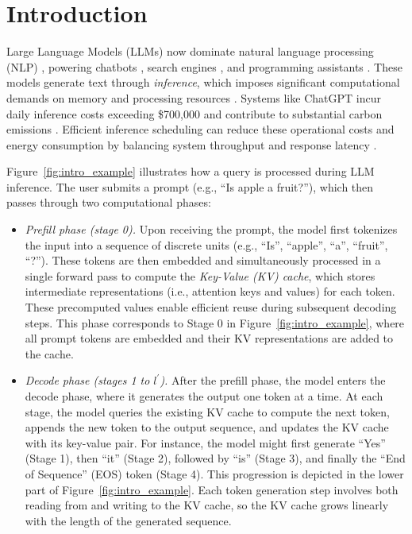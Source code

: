 \section{Introduction}

Large Language Models (LLMs) now dominate natural language processing (NLP) \citep{devlin2019bert, brown2020language, kaplan2020scaling, ouyang2022training, wei2022emergent, wei2022chain, touvron2023llama, openai2024gpt4technicalreport}, powering chatbots \citep{anthropic2023claude, bai2023qwen, openai2024gpt4technicalreport, deepseekai2025deepseekr1incentivizingreasoningcapability}, search engines \citep{google2023bard, microsoft2023bing}, and programming assistants \citep{copilot, claude_3_7}. These models generate text through \textit{inference}, which imposes significant computational demands on memory and processing resources \citep{garcia2019estimation}. Systems like ChatGPT incur daily inference costs exceeding \$700,000 and contribute to substantial carbon emissions \citep{patel2023peeling, patterson2021carbon}. Efficient inference scheduling can reduce these operational costs and energy consumption \citep{strubell2019energy, desislavov2021compute} by balancing system throughput and response latency \citep{wu2022sustainable}.

Figure~\ref{fig:intro_example} illustrates how a query is processed during LLM inference. The user submits a prompt (e.g., ``Is apple a fruit?''), which then passes through two computational phases:
\begin{itemize}
    \item \emph{Prefill phase (stage 0).} Upon receiving the prompt, the model first tokenizes the input into a sequence of discrete units (e.g., ``Is'', ``apple'', ``a'', ``fruit'', ``?''). These tokens are then embedded and simultaneously processed in a single forward pass to compute the \emph{Key-Value (KV) cache}, which stores intermediate representations (i.e., attention keys and values) for each token. These precomputed values enable efficient reuse during subsequent decoding steps. This phase corresponds to Stage 0 in Figure~\ref{fig:intro_example}, where all prompt tokens are embedded and their KV representations are added to the cache.

    \item \emph{Decode phase (stages 1 to $l^\prime$).} After the prefill phase, the model enters the decode phase, where it generates the output one token at a time. At each stage, the model queries the existing KV cache to compute the next token, appends the new token to the output sequence, and updates the KV cache with its key-value pair. For instance, the model might first generate ``Yes'' (Stage 1), then ``it'' (Stage 2), followed by ``is'' (Stage 3), and finally the ``End of Sequence'' (EOS) token (Stage 4). This progression is depicted in the lower part of Figure~\ref{fig:intro_example}. Each token generation step involves both reading from and writing to the KV cache, so the KV cache grows linearly with the length of the generated sequence.
\end{itemize}

